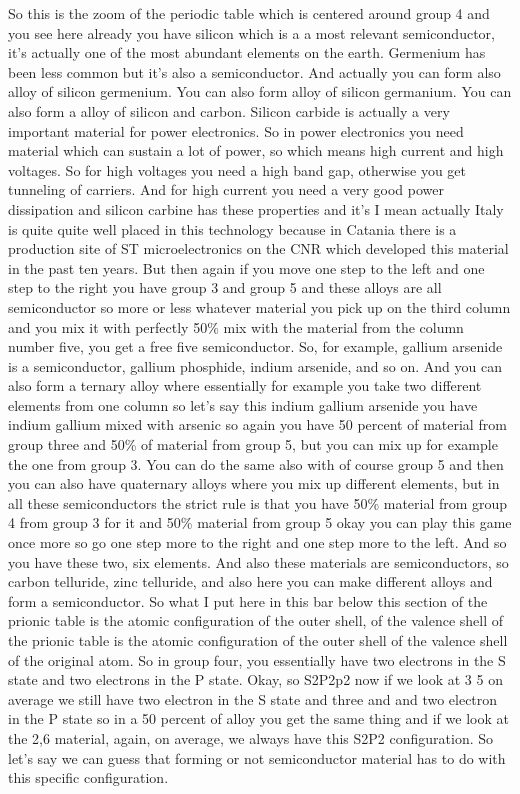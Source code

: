 So this is the zoom of the periodic table which is centered around group 4 and you see here already you have silicon which is a a most relevant semiconductor, it's actually one of the most abundant elements on the earth. Germenium has been less common but it's also a semiconductor. And actually you can form also alloy of silicon germenium. You can also form alloy of silicon germanium. You can also form a alloy of silicon and carbon. Silicon carbide is actually a very important material for power electronics. So in power electronics you need material which can sustain a lot of power, so which means high current and high voltages. So for high voltages you need a high band gap, otherwise you get tunneling of carriers. And for high current you need a very good power dissipation and silicon carbine has these properties and it's I mean actually Italy is quite quite well placed in this technology because in Catania there is a production site of ST microelectronics on the CNR which developed this material in the past ten years. But then again if you move one step to the left and one step to the right you have group 3 and group 5 and these alloys are all semiconductor so more or less whatever material you pick up on the third column and you mix it with perfectly 50\% mix with the material from the column number five, you get a free five semiconductor. So, for example, gallium arsenide is a semiconductor, gallium phosphide, indium arsenide, and so on. And you can also form a ternary alloy where essentially for example you take two different elements from one column so let's say this indium gallium arsenide you have indium gallium mixed with arsenic so again you have 50 percent of material from group three and 50\% of material from group 5, but you can mix up for example the one from group 3. You can do the same also with of course group 5 and then you can also have quaternary alloys where you mix up different elements, but in all these semiconductors the strict rule is that you have 50\% material from group 4 from group 3 for it and 50\% material from group 5 okay you can play this game once more so go one step more to the right and one step more to the left. And so you have these two, six elements. And also these materials are semiconductors, so carbon telluride, zinc telluride, and also here you can make different alloys and form a semiconductor. So what I put here in this bar below this section of the prionic table is the atomic configuration of the outer shell, of the valence shell of the prionic table is the atomic configuration of the outer shell of the valence shell of the original atom. So in group four, you essentially have two electrons in the S state and two electrons in the P state. Okay, so S2P2p2 now if we look at 3 5 on average we still have two electron in the S state and three and and two electron in the P state so in a 50 percent of alloy you get the same thing and if we look at the 2,6 material, again, on average, we always have this S2P2 configuration. So let's say we can guess that forming or not semiconductor material has to do with this specific configuration.
